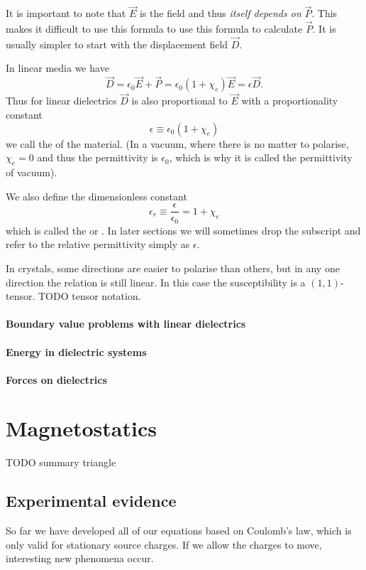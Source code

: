 It is important to note that $\vec{E}$ is the  field and thus \textit{itself depends on} $\vec{P}$. This makes it difficult to use this formula to use this formula to calculate $\vec{P}$. It is usually simpler to start with the displacement field $\vec{D}$.

In linear media we have
\[ \vec{D} = \epsilon_0 \vec{E} + \vec{P} = \epsilon_0 (1+\chi_e)\vec{E} = \epsilon \vec{D}. \]
Thus for linear dielectrics $\vec{D}$ is also proportional to $\vec{E}$ with a proportionality constant
\[ \epsilon \equiv \epsilon_0 (1+\chi_e) \]
we call the  of the material. (In a vacuum, where there is no matter to polarise, $\chi_e = 0$ and thus the permittivity is $\epsilon_0$, which is why it is called the permittivity of vacuum).

We also define the dimensionless constant
\[ \epsilon_r \equiv \frac{\epsilon}{\epsilon_0} = 1 + \chi_e \]
which is called the  or . In later sections we will sometimes drop the subscript and refer to the relative permittivity simply as $\epsilon$.

In crystals, some directions are easier to polarise than others, but in any one direction the relation is still linear. In this case the susceptibility is a $(1,1)$-tensor. TODO tensor notation.

\subsubsection{Boundary value problems with linear dielectrics}
\subsubsection{Energy in dielectric systems}

\subsubsection{Forces on dielectrics}

\chapter{Magnetostatics}
TODO summary triangle
\section{Experimental evidence}
So far we have developed all of our equations based on Coulomb's law, which is only valid for stationary source charges. If we allow the charges to move, interesting new phenomena occur.


